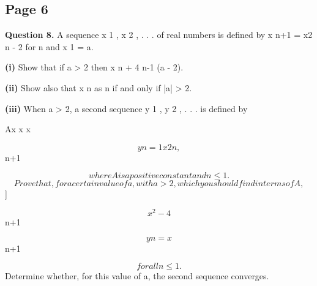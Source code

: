 \documentclass[12pt]{article}
\begin{document}
\subsection*{Page 6}
\begin{flushleft}
\bigskip\textbf{Question 8.} A sequence x 1 , x 2 , . . . of real numbers is defined by x n+1 = x2 n - 2 for n  and x 1 = a.\par
\textbf{(i)} Show that if a > 2 then x n  + 4 n-1 (a - 2).\par
\textbf{(ii)} Show also that x n \to \infty as n \to \infty if and only if |a| > 2.\par
\textbf{(iii)} When a > 2, a second sequence y 1 , y 2 , . . . is defined by\par
Ax x \cdots x\par
\[y n = 1 x 2 n ,\]
n+1\par
\[where A is a positive constant and n \leq 1.\]
\[Prove that, for a certain value of a, with a > 2, which you should find in terms of A,\]
]\par
\[x^2 - 4\]
n+1\par
\[y n = x\]
n+1\par
\[for all n \leq 1.\]
Determine whether, for this value of a, the second sequence converges.\par
\end{flushleft}
\end{document}
